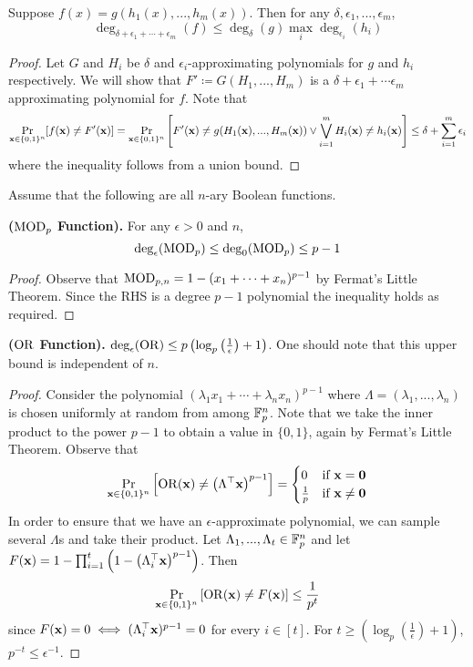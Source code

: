 \documentclass[11pt]{article}
\begin{document}
	\begin{lemma}
		\label{lem:EpsApprox-degofcompfunction}
		Suppose $f(x) = g(h_1(x), ..., h_m(x))$. Then for any $\delta, \epsilon_1, ..., \epsilon_m$, 
		\[\deg_{\delta + \epsilon_1 + \cdots + \epsilon_m}(f) \leq \deg_{\delta}(g)\max_{i}\deg_{\epsilon_i}(h_i)\]
	\end{lemma}
	\begin{proof}
		Let $G$ and $H_i$ be $\delta$ and $\epsilon_i$-approximating polynomials for $g$ and $h_i$ respectively. We will show that $F' \coloneqq G(H_1, ..., H_m)$ is a $\delta + \epsilon_1 + \cdots \epsilon_m$ approximating polynomial for $f$. Note that 
		\[\Pr_{\mathbf{x} \in \{0,1\}^n}[f(\mathbf{x}) \neq F'(\mathbf{x})] = \Pr_{\mathbf{x} \in \{0,1\}^n}\left[F'(\mathbf{x}) \neq g(H_1(\mathbf{x}), ..., H_m(\mathbf{x})) \lor \bigvee_{i = 1}^{m} H_i(\mathbf{x}) \neq h_i(\mathbf{x})\right]\leq \delta + \sum_{i = 1}^{m}\epsilon_i\]
		where the inequality follows from a union bound. 
	\end{proof}
	
	Assume that the following are all $n$-ary Boolean functions.
	\begin{lemma}
		\label{lem:DegEpsApprox-modp}
		\textbf{($\mathrm{MOD}_p$ Function).} For any $\epsilon > 0$ and $n$,
		\[\deg_{\epsilon}(\mathrm{MOD}_p) \leq \deg_{0}(\mathrm{MOD}_p) \leq p-1\]
	\end{lemma}
	\begin{proof}
		Observe that $\mathrm{MOD}_{p,n} = 1 - (x_1 + \cdots + x_n)^{p-1}$ by Fermat's Little Theorem. Since the RHS is a degree $p-1$ polynomial the inequality holds as required.
	\end{proof}

	\begin{lemma}
		\label{lem:DegEpsApprox-or}
		\textbf{($\mathrm{OR}$ Function).} $\deg_{\epsilon}(\mathrm{OR}) \leq p\left(\log_p\left(\frac{1}{\epsilon}\right) + 1\right)$. One should note that this upper bound is independent of $n$.
	\end{lemma}
	\begin{proof}
		Consider the polynomial $(\lambda_1x_1 + \cdots + \lambda_nx_n)^{p-1}$ where $\Lambda = (\lambda_1, ..., \lambda_n)$ is chosen uniformly at random from among $\mathbb{F}^n_p$. Note that we take the inner product to the power $p-1$ to obtain a value in $\{0,1\}$, again by Fermat's Little Theorem. Observe that
		\[\Pr_{\mathbf{x} \in \{0,1\}^n}\left[\mathrm{OR}(\mathbf{x}) \neq \left(\Lambda^{\top}\mathbf{x}\right)^{p-1}\right] = 
			\begin{cases}
				0 &\mbox{if } \mathbf{x} = \mathbf{0}\\
				\frac{1}{p} &\mbox{if } \mathbf{x} \neq \mathbf{0} 
			\end{cases}\]
		In order to ensure that we have an $\epsilon$-approximate polynomial, we can sample several $\Lambda$s and take their product. Let $\Lambda_1, ..., \Lambda_t \in \mathbb{F}^n_p$ and let $F(\mathbf{x}) = 1 - \prod_{i = 1}^{t}\left(1 - \left(\Lambda_i^{\top}\mathbf{x}\right)^{p-1}\right)$. Then
		\[\Pr_{\mathbf{x} \in \{0,1\}^n}\left[\mathrm{OR}(\mathbf{x}) \neq F(\mathbf{x})\right] \leq \frac{1}{p^t}\]
		since $F(\mathbf{x}) = 0 \iff (\Lambda_i^{\top}\mathbf{x})^{p-1} = 0$ for every $i\in [t]$. For $t \geq  \left(\log_p\left(\frac{1}{\epsilon}\right) + 1\right)$, $p^{-t} \leq \epsilon^{-1}$. 
	\end{proof}
\end{document}
